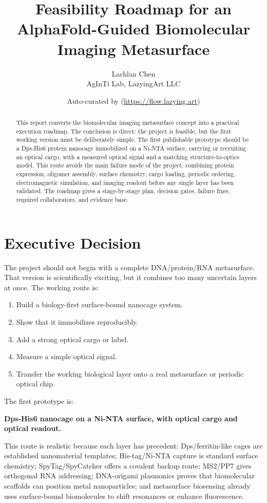 \documentclass[11pt]{article}
\title{\vspace{-1.0cm}Feasibility Roadmap for an AlphaFold-Guided Biomolecular Imaging Metasurface}
\author{Lachlan Chen\\AgInTi Lab, LazyingArt LLC}
\date{Auto-curated by \agintiflow{} (\url{https://flow.lazying.art})}
\begin{document}
\maketitle

\begin{abstract}
This report converts the biomolecular imaging metasurface concept into a practical execution roadmap. The conclusion is direct: the project is feasible, but the first working version must be deliberately simple. The first publishable prototype should be a Dps-His6 protein nanocage immobilized on a Ni-NTA surface, carrying or recruiting an optical cargo, with a measured optical signal and a matching structure-to-optics model. This route avoids the main failure mode of the project: combining protein expression, oligomer assembly, surface chemistry, cargo loading, periodic ordering, electromagnetic simulation, and imaging readout before any single layer has been validated. The roadmap gives a stage-by-stage plan, decision gates, failure fixes, required collaborators, and evidence base.
\end{abstract}

\section{Executive Decision}

The project should not begin with a complete DNA/protein/RNA metasurface. That version is scientifically exciting, but it combines too many uncertain layers at once. The working route is:

\begin{enumerate}
\item Build a biology-first surface-bound nanocage system.
\item Show that it immobilizes reproducibly.
\item Add a strong optical cargo or label.
\item Measure a simple optical signal.
\item Transfer the working biological layer onto a real metasurface or periodic optical chip.
\end{enumerate}

The first prototype is:

\begin{center}
\textbf{Dps-His6 nanocage on a Ni-NTA surface, with optical cargo and optical readout.}
\end{center}

This route is realistic because each layer has precedent: Dps/ferritin-like cages are established nanomaterial templates; His-tag/Ni-NTA capture is standard surface chemistry; SpyTag/SpyCatcher offers a covalent backup route; MS2/PP7 gives orthogonal RNA addressing; DNA-origami plasmonics proves that biomolecular scaffolds can position metal nanoparticles; and metasurface biosensing already uses surface-bound biomolecules to shift resonances or enhance fluorescence.
\end{document}
